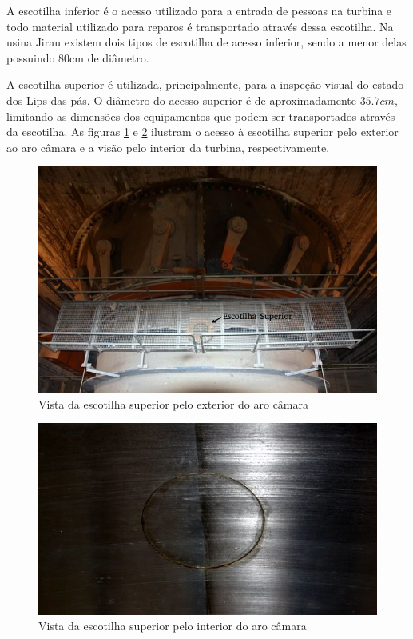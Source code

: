 A escotilha inferior é o acesso utilizado para a entrada de pessoas na turbina e todo 
material utilizado para reparos é transportado através dessa escotilha. Na usina Jirau existem dois 
tipos de escotilha de acesso inferior, sendo a menor delas possuindo 80cm de diâmetro. 

A escotilha superior é utilizada, principalmente, para a inspeção visual do
estado dos Lips das pás.
O diâmetro do acesso superior é de aproximadamente $35.7cm$, limitando as
dimensões dos equipamentos que podem ser transportados através da escotilha. As figuras \ref{fig::esc_sup_ext} e
\ref{fig::esc_sup_int} ilustram o acesso à escotilha superior pelo exterior ao
aro câmara e a visão pelo interior da turbina,
respectivamente.

\begin{figure}[h!]	
	\centering
	\includegraphics[width=0.8\columnwidth]{sota/figs/viagem/img_4979_mod}
	\caption{Vista da escotilha superior pelo exterior do aro câmara}
	\label{fig::esc_sup_ext}
\end{figure}

\begin{figure}[h!]	
	\centering
	\includegraphics[width=0.8\columnwidth]{sota/figs/viagem/img_4982}
	\caption{Vista da escotilha superior pelo interior do aro câmara}
	\label{fig::esc_sup_int}
\end{figure}

